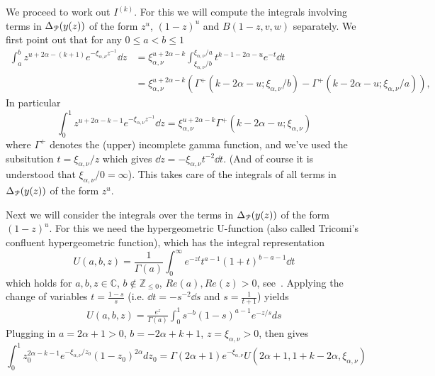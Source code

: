 We proceed to work out $I^{(k)}$. For this we will compute the integrals involving terms in $\Delta_{{\mathcal P}}(y(z))$ of the form $z^u$, $(1-z)^u$ and $B(1-z,v,w)$ separately. We first point out that for any $0 \le a < b \le 1$
\begin{align*}
	\int_a^b z^{u+2\alpha-(k+1)} e^{-\xi_{\alpha,\nu} z^{-1}} \dd z
	&= \xi_{\alpha,\nu}^{u+2\alpha-k} \int_{\xi_{\alpha,\nu}/b}^{\xi_{\alpha,\nu}/a} t^{k-1-2\alpha-u} e^{-t} \dd t \\
	&= \xi_{\alpha,\nu}^{u+2\alpha-k} \left( \Gamma^+( k-2\alpha-u;\xi_{\alpha,\nu}/b) - \Gamma^+( k-2\alpha-u; \xi_{\alpha,\nu}/a) \right), 
\end{align*}
In particular
\begin{equation}\label{eq:integral_Delta_P_z}
	\int_0^1 z^{u+2\alpha-k-1} e^{-\xi_{\alpha,\nu} z^{-1}} \dd z = \xi_{\alpha,\nu}^{u+2\alpha-k} \Gamma^+(k-2\alpha-u;\xi_{\alpha,\nu})
\end{equation}
where $\Gamma^+$ denotes the (upper) incomplete gamma function, and we've used the subsitution
$t = \xi_{\alpha,\nu} / z$ which gives $\dd z = -\xi_{\alpha, \nu} t^{-2} \dd t$. (And of course it is understood that 
$\xi_{\alpha,\nu}/0 = \infty$). This takes care of the integrals of all terms in $\Delta_{{\mathcal P}}(y(z))$ of the form $z^{u}$. 


Next we will consider the integrals over the terms in $\Delta_{{\mathcal P}}(y(z))$ of the form $(1-z)^u$. For this we need the hypergeometric U-function (also called Tricomi's confluent hypergeometric function), which has the integral representation 
\[
	U(a,b,z) = \frac{1}{\Gamma(a)} \int_0^\infty e^{-zt} t^{a-1} (1+t)^{b-a-1} \dd t
\] 
which holds for $a,b,z\in \mathbb{C}$, $b \not \in \mathbb{Z}_{\leq 0}$, $Re(a), Re(z) >0$, see~\cite[p.255]{erdelyi1953higher}. Applying the change of variables $t=\frac{1-s}{s}$ (i.e. $\dd t = -s^{-2} \dd s$ and $s = \frac{1}{t+1}$) yields
\begin{align*}
	U(a,b,z) = \frac{e^z}{\Gamma(a)} \int_0^1 s^{-b} (1-s)^{a-1} e^{-z/s} ds
\end{align*}
Plugging in $a=2\alpha+1 >0$, $b=-2\alpha+k+1$, $z=\xi_{\alpha,\nu}>0$, then gives
\begin{equation}\label{eq:integral_Delta_P_1_z}
	\int_0^1 z_0^{2\alpha-k-1} e^{-\xi_{\alpha,\nu}/z_0} (1-z_0)^{2\alpha} dz_0 = \Gamma(2\alpha+1)e^{-\xi_{\alpha,\nu}} U(2\alpha+1,1+k-2\alpha,\xi_{\alpha,\nu})
\end{equation}

